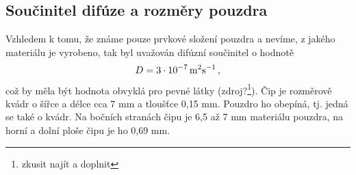 \documentclass[11pt,a4paper]{article}
\begin{document}
\subsection{Součinitel difúze a rozměry pouzdra}
Vzhledem k tomu, že známe pouze prvkové složení pouzdra a nevíme, z jakého materiálu je vyrobeno, tak byl uvažován difúzní součinitel o hodnotě
\begin{equation}
D=\SI[parse-numbers = false]{3\cdot 10^{-7}}{m^2s^{-1}}\,,
\end{equation}
což by měla být hodnota obvyklá pro pevné látky (zdroj?\footnote{zkusit najít a doplnit}). Čip je rozměrově kvádr o šířce a délce cca 7 mm a tloušťce 0,15 mm. Pouzdro ho obepíná, tj. jedná se také o kvádr. Na bočních stranách čipu je 6,5 až 7 mm materiálu pouzdra, na horní a dolní ploše čipu je ho 0,69 mm. 
\end{document}
